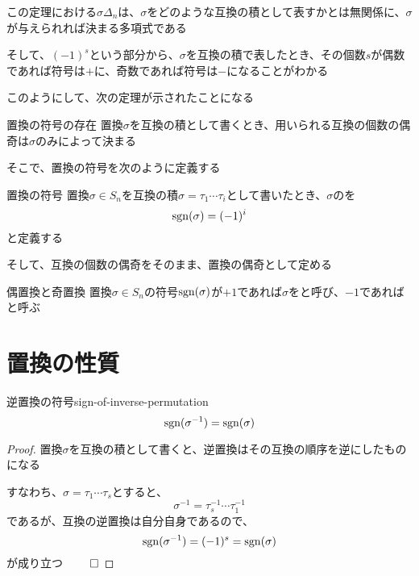 \documentclass[../../../topic_linear-algebra]{subfiles}
\begin{document}
この定理における$\sigma\Delta_n$は、$\sigma$をどのような互換の積として表すかとは無関係に、$\sigma$が与えられれば決まる多項式である

\br

そして、$(-1)^s$という部分から、$\sigma$を互換の積で表したとき、その個数$s$が偶数であれば符号は$+$に、奇数であれば符号は$-$になることがわかる

\br

このようにして、次の定理が示されたことになる

\begin{theorem*}{置換の符号の存在}
  置換$\sigma$を互換の積として書くとき、用いられる互換の個数の偶奇は$\sigma$のみによって決まる
\end{theorem*}

そこで、置換の符号を次のように定義する

\begin{definition*}{置換の符号}
  置換$\sigma \in S_n$を互換の積$\sigma = \tau_1 \cdots \tau_i$として書いたとき、$\sigma$のを
  \begin{equation*}
    \operatorname{sgn}(\sigma) = (-1)^i
  \end{equation*}
  と定義する
\end{definition*}

そして、互換の個数の偶奇をそのまま、置換の偶奇として定める

\begin{definition*}{偶置換と奇置換}
  置換$\sigma \in S_n$の符号$\operatorname{sgn}(\sigma)$が$+1$であれば$\sigma$をと呼び、$-1$であればと呼ぶ
\end{definition*}

\sectionline
\section{置換の性質}

\begin{theorem}{逆置換の符号}{sign-of-inverse-permutation}
  \begin{equation*}
    \operatorname{sgn}(\sigma^{-1}) = \operatorname{sgn}(\sigma)
  \end{equation*}
\end{theorem}

\begin{proof}
  置換$\sigma$を互換の積として書くと、逆置換はその互換の順序を逆にしたものになる

  すなわち、$\sigma = \tau_1 \cdots \tau_s$とすると、
  \begin{equation*}
    \sigma^{-1} = \tau_s^{-1} \cdots \tau_1^{-1}
  \end{equation*}
  であるが、互換の逆置換は自分自身であるので、
  \begin{equation*}
    \operatorname{sgn}(\sigma^{-1}) = (-1)^s = \operatorname{sgn}(\sigma)
  \end{equation*}
  が成り立つ $\qed$
\end{proof}
\end{document}
